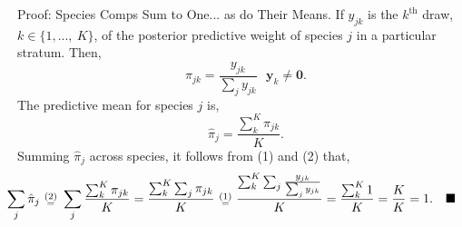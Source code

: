 \documentclass[ xcolor = pdftex, dvipsnames, table ]{beamer}
\begin{document}
%
%

%
\begin{frame}{Proof: Species Comps Sum to One... as do Their Means.}
%
If $y_{jk}$ is the $k^{\text{th}}$ draw, $k\in\{1,...,~K\}$, of the posterior predictive weight of species $j$ in a particular stratum. Then,
%
\begin{equation}
\pi_{jk} = \frac{y_{jk}}{\sum_j y_{jk}} ~~~ \bm{y}_{k}\neq \bm{0}.
\end{equation}
The predictive mean for species $j$ is,
\begin{equation}
        \hat\pi_{j} = \frac{\sum_k^K \pi_{jk}}{K}. 
\end{equation}
Summing $\hat\pi_{j}$ across species, it follows from (1) and (2) that,
\begin{equation*}
        \hspace*{-0.8cm}
        \sum_j \hat\pi_{j} ~\substack{(2)\\=}~ \sum_j\frac{\sum_k^K \pi_{jk}}{K} = \frac{\sum_k^K \sum_j \pi_{jk}}{K}~\substack{(1)\\=}~\frac{\sum_k^K \sum_j \frac{y_{jk}}{\sum_j y_{jk}}}{K} = \frac{\sum_k^K 1}{K} = \frac{K}{K}=1. ~~~\blacksquare
\end{equation*}
%
\end{frame}

%
\setcounter{equation}{0}
%
\end{document}
